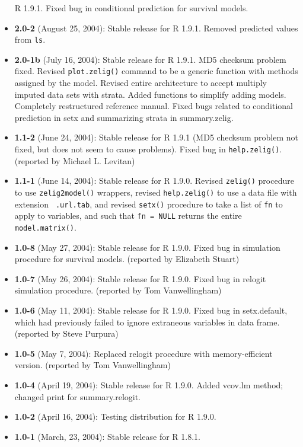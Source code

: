 \documentclass[oneside,letterpaper,12pt]{book}
\begin{document}
\begin{itemize}
R 1.9.1.  Fixed bug in conditional prediction for survival models.  
\item \textbf{2.0-2} (August 25, 2004): Stable release for R 1.9.1.  
Removed predicted values from {\tt ls}.  
\item \textbf{2.0-1b} (July 16, 2004): Stable release for R 1.9.1.  MD5
  checksum problem fixed.  Revised {\tt plot.zelig()} command to be a
  generic function with methods assigned by the model.  Revised entire
  architecture to accept multiply imputed data sets with strata.
  Added functions to simplify adding models.  Completely restructured
  reference manual.  Fixed bugs related to conditional prediction in
  setx and summarizing strata in summary.zelig.
 \item \textbf{1.1-2} (June 24, 2004): Stable release for R 1.9.1 (MD5
  checksum problem not fixed, but does not seem to cause problems).
  Fixed bug in {\tt help.zelig()}.  (reported by Michael L. Levitan)
\item \textbf{1.1-1} (June 14, 2004): Stable release for R 1.9.0.
  Revised {\tt zelig()} procedure to use {\tt zelig2model()} wrappers,
  revised {\tt help.zelig()} to use a data file with extension {\tt
    .url.tab}, and revised {\tt setx()} procedure to take a list of
  {\tt fn} to apply to variables, and such that {\tt fn = NULL}
  returns the entire {\tt model.matrix()}.
 \item \textbf{1.0-8} (May 27, 2004): Stable release for R 1.9.0.
   Fixed bug in simulation procedure for survival models.  (reported
   by Elizabeth Stuart) 
 \item \textbf{1.0-7} (May 26, 2004): Stable release for R 1.9.0. Fixed 
   bug in relogit simulation procedure.  (reported by Tom Vanwellingham)
 \item \textbf{1.0-6} (May 11, 2004):  Stable release for R 1.9.0.  
   Fixed bug in setx.default, which had previously failed to ignore 
   extraneous variables in data frame.  (reported by Steve Purpura) 
 \item \textbf{1.0-5} (May 7, 2004): Replaced relogit procedure with 
   memory-efficient version. (reported by Tom Vanwellingham)
 \item \textbf{1.0-4} (April 19, 2004):  Stable release for R 1.9.0.  
   Added vcov.lm method; changed print for summary.relogit. 
 \item \textbf{1.0-2} (April 16, 2004): Testing distribution for R 1.9.0. 
 \item \textbf{1.0-1} (March, 23, 2004): Stable release for R 1.8.1. 
\end{itemize}
\end{document}
